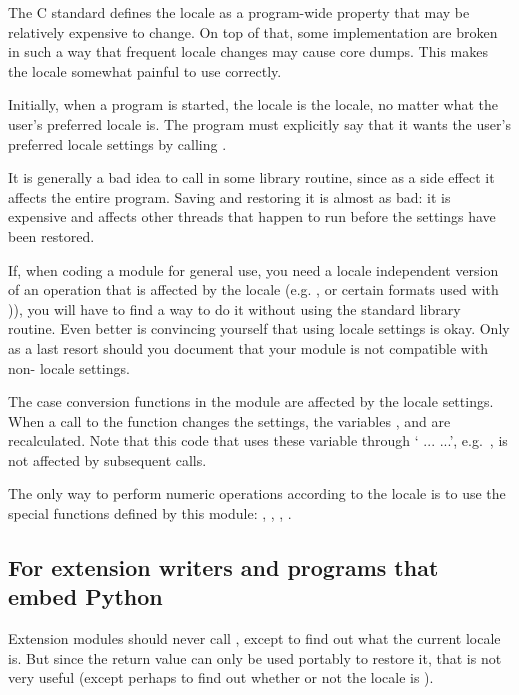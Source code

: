 The C standard defines the locale as a program-wide property that may
be relatively expensive to change.  On top of that, some
implementation are broken in such a way that frequent locale changes
may cause core dumps.  This makes the locale somewhat painful to use
correctly.

Initially, when a program is started, the locale is the  locale, no
matter what the user's preferred locale is.  The program must
explicitly say that it wants the user's preferred locale settings by
calling .

It is generally a bad idea to call  in some library
routine, since as a side effect it affects the entire program.  Saving
and restoring it is almost as bad: it is expensive and affects other
threads that happen to run before the settings have been restored.

If, when coding a module for general use, you need a locale
independent version of an operation that is affected by the locale
(e.g. , or certain formats used with
)), you will have to find a way to do it
without using the standard library routine.  Even better is convincing
yourself that using locale settings is okay.  Only as a last resort
should you document that your module is not compatible with
non- locale settings.

The case conversion functions in the
 module are affected by the
locale settings.  When a call to the  function
changes the  settings, the variables
,  and
 are recalculated.  Note that this code that uses
these variable through ` ...  ...',
e.g.\ , is not affected by subsequent
 calls.

The only way to perform numeric operations according to the locale
is to use the special functions defined by this module:
, , ,
.

\subsection{For extension writers and programs that embed Python
            \label{embedding-locale}}

Extension modules should never call , except to
find out what the current locale is.  But since the return value can
only be used portably to restore it, that is not very useful (except
perhaps to find out whether or not the locale is ).

